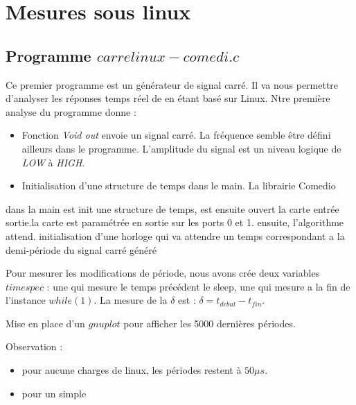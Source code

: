 \section{Mesures sous linux}
\subsection{Programme $carrelinux-comedi.c$}
Ce premier programme est un générateur de signal carré. Il va nous permettre d'analyser les réponses temps réel de en étant basé sur Linux. Ntre première analyse du programme donne :\begin{itemize}
\item Fonction \emph{Void out} envoie un signal carré. La fréquence semble être défini ailleurs dans le programme. L'amplitude du signal est un niveau logique de \emph{LOW} à \emph{HIGH}.
\item Initialisation d'une structure de temps dans le main. La librairie Comedio
\end{itemize}

dans la main est init une structure de temps, est ensuite ouvert la carte entrée sortie.la carte est paramétrée en sortie sur les ports 0 et 1. 
ensuite, l'algorithme attend.
initialisation d'une horloge qui va attendre un temps correspondant a la demi-période  du signal carré généré


Pour mesurer les modifications de période, nous avons crée deux variables $timespec$ : une qui mesure le temps précédent le sleep, une qui mesure a la fin de l'instance $while(1)$. La mesure de la $\delta$ est : $\delta = t_{debut} - t_{fin}$. 

Mise en place d'un $gnuplot$ pour afficher les 5000 dernières périodes. 

Observation : \begin{itemize}
\item pour aucune charges de linux, les périodes restent à $50\mu s$. 
\item pour un simple 
\end{itemize}
